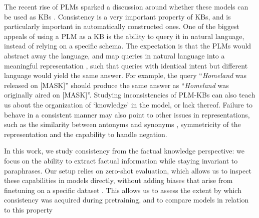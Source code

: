 The recent rise of PLMs sparked a discussion around whether these models can be used as KBs  \cite{lama,petroni2020how,alpaqa,roberts2020much}. 
Consistency is a very important property of KBs, and is particularly important in automatically constructed ones.
One of the biggest appeals of using a PLM as a KB  is the ability to query it in natural language, instead of relying on a specific schema.
The expectation is that the PLMs  would abstract away the language, and map queries in natural language into a meaningful representation , such that queries with identical intent but different language  would yield the same answer. 
For example, the query ``\textit{Homeland} was released on [MASK]'' should produce the same answer as ``\textit{Homeland} was originally aired on [MASK]''. 
Studying inconsistencies of PLM-KBs can also teach us about the organization of `knowledge' in the model, or lack thereof. 
Failure to behave in a consistent manner may also point to other issues in representations, 
such as the similarity between antonyms and synonyms \cite{nguyen2016integrating}, symmetricity of the representation and the capability to handle negation. 

In this work, we study consistency from the factual knowledge perspective: we focus on the ability to extract factual information while staying invariant to paraphrases.
Our setup relies on zero-shot evaluation, which allows us to inspect these capabilities in models directly, without adding biases that arise from finetuning on a specific dataset . This allows us to assess the extent by which consistency was acquired during pretraining, and to compare models in relation to this property %


